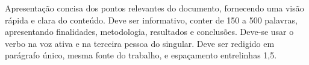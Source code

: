 Apresentação concisa dos pontos relevantes do documento, fornecendo uma visão rápida e clara do conteúdo. Deve ser informativo, conter de 150 a 500 palavras, apresentando finalidades, metodologia, resultados e conclusões. Deve-se usar o verbo na voz ativa e na terceira pessoa do singular. Deve ser redigido em parágrafo único, mesma fonte do trabalho, e espaçamento entrelinhas 1,5.

